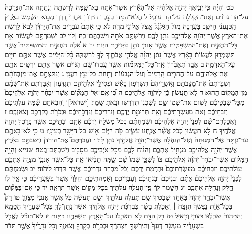 \documentclass[twoside, openany, parskip=half, 11pt]{book}
\begin{document}
כט וְהָיָ֗ה כִּ֤י יְבִֽיאֲךָ֙ יְהֹוָ֣ה אֱלֹהֶ֔יךָ אֶל־הָאָ֕רֶץ אֲשֶׁר־אַתָּ֥ה בָא־שָׁ֖מָּה לְרִשְׁתָּ֑הּ וְנָתַתָּ֤ה אֶת־הַבְּרָכָה֙ עַל־הַ֣ר גְּרִזִ֔ים וְאֶת־הַקְּלָלָ֖ה עַל־הַ֥ר עֵיבָֽל׃ ל הֲלֹא־הֵ֜מָּה בְּעֵ֣בֶר הַיַּרְדֵּ֗ן אַֽחֲרֵי֙ דֶּ֚רֶךְ מְב֣וֹא הַשֶּׁ֔מֶשׁ בְּאֶ֙רֶץ֙ הַֽכְּנַעֲנִ֔י הַיֹּשֵׁ֖ב בָּעֲרָבָ֑ה מ֚וּל הַגִּלְגָּ֔ל אֵ֖צֶל אֵלוֹנֵ֥י מֹרֶֽה׃ לא כִּ֤י אַתֶּם֙ עֹבְרִ֣ים אֶת־הַיַּרְדֵּ֔ן לָבֹא֙ לָרֶ֣שֶׁת אֶת־הָאָ֔רֶץ אֲשֶׁר־יְהֹוָ֥ה אֱלֹהֵיכֶ֖ם נֹתֵ֣ן לָכֶ֑ם וִֽירִשְׁתֶּ֥ם אֹתָ֖הּ וִֽישַׁבְתֶּם־בָּֽהּ׃ [לוי]לב וּשְׁמַרְתֶּ֣ם לַעֲשׂ֔וֹת אֵ֥ת כׇּל־הַֽחֻקִּ֖ים וְאֶת־הַמִּשְׁפָּטִ֑ים אֲשֶׁ֧ר אָנֹכִ֛י נֹתֵ֥ן לִפְנֵיכֶ֖ם הַיּֽוֹם׃ יב א אֵ֠לֶּה הַֽחֻקִּ֣ים וְהַמִּשְׁפָּטִים֮ אֲשֶׁ֣ר תִּשְׁמְר֣וּן לַעֲשׂוֹת֒ בָּאָ֕רֶץ אֲשֶׁר֩ נָתַ֨ן יְהֹוָ֜ה אֱלֹהֵ֧י אֲבֹתֶ֛יךָ לְךָ֖ לְרִשְׁתָּ֑הּ כׇּ֨ל־הַיָּמִ֔ים אֲשֶׁר־אַתֶּ֥ם חַיִּ֖ים עַל־הָאֲדָמָֽה׃ ב אַבֵּ֣ד תְּ֠אַבְּד֠וּן אֶֽת־כׇּל־הַמְּקֹמ֞וֹת אֲשֶׁ֧ר עָֽבְדוּ־שָׁ֣ם הַגּוֹיִ֗ם אֲשֶׁ֥ר אַתֶּ֛ם יֹרְשִׁ֥ים אֹתָ֖ם אֶת־אֱלֹהֵיהֶ֑ם עַל־הֶהָרִ֤ים הָֽרָמִים֙ וְעַל־הַגְּבָע֔וֹת וְתַ֖חַת כׇּל־עֵ֥ץ רַעֲנָֽן׃ ג וְנִתַּצְתֶּ֣ם אֶת־מִזְבְּחֹתָ֗ם וְשִׁבַּרְתֶּם֙ אֶת־מַצֵּ֣בֹתָ֔ם וַאֲשֵֽׁרֵיהֶם֙ תִּשְׂרְפ֣וּן בָּאֵ֔שׁ וּפְסִילֵ֥י אֱלֹֽהֵיהֶ֖ם תְּגַדֵּע֑וּן וְאִבַּדְתֶּ֣ם אֶת־שְׁמָ֔ם מִן־הַמָּק֖וֹם הַהֽוּא׃ ד לֹֽא־תַעֲשׂ֣וּן כֵּ֔ן לַיהֹוָ֖ה אֱלֹהֵיכֶֽם׃ ה כִּ֠י אִֽם־אֶל־הַמָּק֞וֹם אֲשֶׁר־יִבְחַ֨ר יְהֹוָ֤ה אֱלֹֽהֵיכֶם֙ מִכׇּל־שִׁבְטֵיכֶ֔ם לָשׂ֥וּם אֶת־שְׁמ֖וֹ שָׁ֑ם לְשִׁכְנ֥וֹ תִדְרְשׁ֖וּ וּבָ֥אתָ שָּֽׁמָּה׃ [ישראל]ו וַהֲבֵאתֶ֣ם שָׁ֗מָּה עֹלֹֽתֵיכֶם֙ וְזִבְחֵיכֶ֔ם וְאֵת֙ מַעְשְׂרֹ֣תֵיכֶ֔ם וְאֵ֖ת תְּרוּמַ֣ת יֶדְכֶ֑ם וְנִדְרֵיכֶם֙ וְנִדְבֹ֣תֵיכֶ֔ם וּבְכֹרֹ֥ת בְּקַרְכֶ֖ם וְצֹאנְכֶֽם׃ ז וַאֲכַלְתֶּם־שָׁ֗ם לִפְנֵי֙ יְהֹוָ֣ה אֱלֹֽהֵיכֶ֔ם וּשְׂמַחְתֶּ֗ם בְּכֹל֙ מִשְׁלַ֣ח יֶדְכֶ֔ם אַתֶּ֖ם וּבָתֵּיכֶ֑ם אֲשֶׁ֥ר בֵּֽרַכְךָ֖ יְהֹוָ֥ה אֱלֹהֶֽיךָ׃ ח לֹ֣א תַעֲשׂ֔וּן כְּ֠כֹ֠ל אֲשֶׁ֨ר אֲנַ֧חְנוּ עֹשִׂ֛ים פֹּ֖ה הַיּ֑וֹם אִ֖ישׁ כׇּל־הַיָּשָׁ֥ר בְּעֵינָֽיו׃ ט כִּ֥י לֹא־בָאתֶ֖ם עַד־עָ֑תָּה אֶל־הַמְּנוּחָה֙ וְאֶל־הַֽנַּחֲלָ֔ה אֲשֶׁר־יְהֹוָ֥ה אֱלֹהֶ֖יךָ נֹתֵ֥ן לָֽךְ׃ י וַעֲבַרְתֶּם֮ אֶת־הַיַּרְדֵּן֒ וִֽישַׁבְתֶּ֣ם בָּאָ֔רֶץ אֲשֶׁר־יְהֹוָ֥ה אֱלֹהֵיכֶ֖ם מַנְחִ֣יל אֶתְכֶ֑ם וְהֵנִ֨יחַ לָכֶ֧ם מִכׇּל־אֹיְבֵיכֶ֛ם מִסָּבִ֖יב וִֽישַׁבְתֶּם־בֶּֽטַח׃ שנייא וְהָיָ֣ה הַמָּק֗וֹם אֲשֶׁר־יִבְחַר֩ יְהֹוָ֨ה אֱלֹהֵיכֶ֥ם בּוֹ֙ לְשַׁכֵּ֤ן שְׁמוֹ֙ שָׁ֔ם שָׁ֣מָּה תָבִ֔יאוּ אֵ֛ת כׇּל־אֲשֶׁ֥ר אָנֹכִ֖י מְצַוֶּ֣ה אֶתְכֶ֑ם עוֹלֹתֵיכֶ֣ם וְזִבְחֵיכֶ֗ם מַעְשְׂרֹֽתֵיכֶם֙ וּתְרֻמַ֣ת יֶדְכֶ֔ם וְכֹל֙ מִבְחַ֣ר נִדְרֵיכֶ֔ם אֲשֶׁ֥ר תִּדְּר֖וּ לַיהֹוָה׃ יב וּשְׂמַחְתֶּ֗ם לִפְנֵי֮ יְהֹוָ֣ה אֱלֹֽהֵיכֶם֒ אַתֶּ֗ם וּבְנֵיכֶם֙ וּבְנֹ֣תֵיכֶ֔ם וְעַבְדֵיכֶ֖ם וְאַמְהֹתֵיכֶ֑ם וְהַלֵּוִי֙ אֲשֶׁ֣ר בְּשַֽׁעֲרֵיכֶ֔ם כִּ֣י אֵ֥ין ל֛וֹ חֵ֥לֶק וְנַחֲלָ֖ה אִתְּכֶֽם׃ יג הִשָּׁ֣מֶר לְךָ֔ פֶּֽן־תַּעֲלֶ֖ה עֹלֹתֶ֑יךָ בְּכׇל־מָק֖וֹם אֲשֶׁ֥ר תִּרְאֶֽה׃ יד כִּ֣י אִם־בַּמָּק֞וֹם אֲשֶׁר־יִבְחַ֤ר יְהֹוָה֙ בְּאַחַ֣ד שְׁבָטֶ֔יךָ שָׁ֖ם תַּעֲלֶ֣ה עֹלֹתֶ֑יךָ וְשָׁ֣ם תַּעֲשֶׂ֔ה כֹּ֛ל אֲשֶׁ֥ר אָנֹכִ֖י מְצַוֶּֽךָּ׃ טו רַק֩ בְּכׇל־אַוַּ֨ת נַפְשְׁךָ֜ תִּזְבַּ֣ח ׀ וְאָכַלְתָּ֣ בָשָׂ֗ר כְּבִרְכַּ֨ת יְהֹוָ֧ה אֱלֹהֶ֛יךָ אֲשֶׁ֥ר נָֽתַן־לְךָ֖ בְּכׇל־שְׁעָרֶ֑יךָ הַטָּמֵ֤א וְהַטָּהוֹר֙ יֹאכְלֶ֔נּוּ כַּצְּבִ֖י וְכָאַיָּֽל׃ טז רַ֥ק הַדָּ֖ם לֹ֣א תֹאכֵ֑לוּ עַל־הָאָ֥רֶץ תִּשְׁפְּכֶ֖נּוּ כַּמָּֽיִם׃ יז לֹֽא־תוּכַ֞ל לֶאֱכֹ֣ל בִּשְׁעָרֶ֗יךָ מַעְשַׂ֤ר דְּגָֽנְךָ֙ וְתִירֹֽשְׁךָ֣ וְיִצְהָרֶ֔ךָ וּבְכֹרֹ֥ת בְּקָרְךָ֖ וְצֹאנֶ֑ךָ וְכׇל־נְדָרֶ֙יךָ֙ אֲשֶׁ֣ר תִּדֹּ֔ר 
\end{document}
